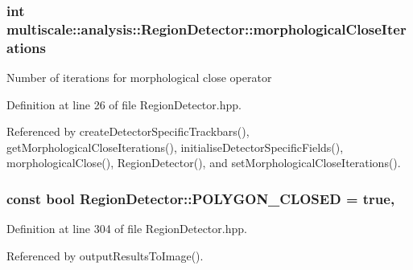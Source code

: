 \hypertarget{classmultiscale_1_1analysis_1_1RegionDetector_a700a2f299d7c56fbd1fdbec68092f23a}{
\subsubsection[{morphological\-Close\-Iterations}]{\setlength{\rightskip}{0pt plus 5cm}int multiscale\-::analysis\-::\-Region\-Detector\-::morphological\-Close\-Iterations\hspace{0.3cm}{\ttfamily [private]}}}\label{classmultiscale_1_1analysis_1_1RegionDetector_a700a2f299d7c56fbd1fdbec68092f23a}
Number of iterations for morphological close operator 

Definition at line 26 of file Region\-Detector.\-hpp.



Referenced by create\-Detector\-Specific\-Trackbars(), get\-Morphological\-Close\-Iterations(), initialise\-Detector\-Specific\-Fields(), morphological\-Close(), Region\-Detector(), and set\-Morphological\-Close\-Iterations().

\hypertarget{classmultiscale_1_1analysis_1_1RegionDetector_a1b3de2646beaac60d03527f1775614be}{
\subsubsection[{P\-O\-L\-Y\-G\-O\-N\-\_\-\-C\-L\-O\-S\-E\-D}]{\setlength{\rightskip}{0pt plus 5cm}const bool Region\-Detector\-::\-P\-O\-L\-Y\-G\-O\-N\-\_\-\-C\-L\-O\-S\-E\-D = true\hspace{0.3cm}{\ttfamily [static]}, {\ttfamily [private]}}}\label{classmultiscale_1_1analysis_1_1RegionDetector_a1b3de2646beaac60d03527f1775614be}


Definition at line 304 of file Region\-Detector.\-hpp.



Referenced by output\-Results\-To\-Image().

